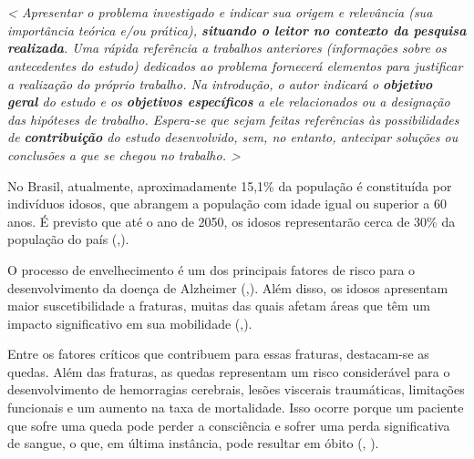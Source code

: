 \chapter*{}
\noindent
{}



\vspace{1.4cm}

\textit{< Apresentar
o problema investigado e indicar sua origem e relevância (sua importância
teórica e/ou prática),\textbf{ situando o leitor no contexto da pesquisa
realizada}.
Uma rápida referência a trabalhos anteriores (informações sobre os antecedentes do estudo) dedicados ao problema fornecerá
elementos para justificar a realização do próprio trabalho.
Na introdução, o autor indicará o \textbf{objetivo geral }do estudo e os \textbf{objetivos específicos} a ele relacionados ou a designação das hipóteses de trabalho.
Espera-se que sejam feitas referências
às possibilidades de \textbf{contribuição} do estudo desenvolvido, sem, no entanto, antecipar soluções ou conclusões a que se chegou no trabalho.
>
}
\vspace{0.5cm}
\par No Brasil, atualmente, aproximadamente 15,1\% da população é constituída por indivíduos idosos, que abrangem a população com idade igual ou superior a 60 anos. É previsto que até o ano de 2050, os idosos representarão cerca de 30\% da população do país (,\citeyear{IdososBrasil}). 

O processo de envelhecimento é um dos principais fatores de risco para o desenvolvimento da doença de Alzheimer (,\citeyear{AlzheimerAssociation}).  
Além disso, os idosos apresentam maior suscetibilidade a fraturas, muitas das quais afetam áreas que têm um impacto significativo em sua mobilidade (,\citeyear{PreventionFalls}). 

Entre os fatores críticos que contribuem para essas fraturas, destacam-se as quedas. Além das fraturas, as quedas representam um risco considerável para o desenvolvimento de hemorragias cerebrais, lesões viscerais traumáticas, limitações funcionais e um aumento na taxa de mortalidade. Isso ocorre porque um paciente que sofre uma queda pode perder a consciência e sofrer uma perda significativa de sangue, o que, em última instância, pode resultar em óbito (, \citeyear{PreventionFalls}).

